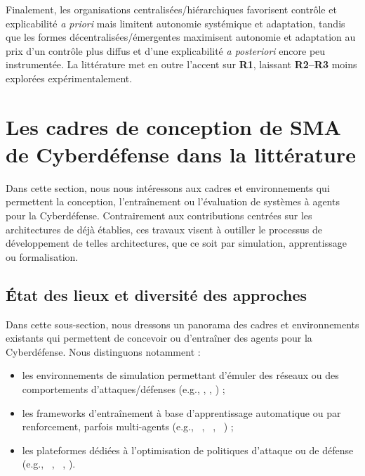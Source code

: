 Finalement, les organisations centralisées/hiérarchiques favorisent contrôle et explicabilité \emph{a priori} mais limitent autonomie systémique et adaptation, tandis que les formes décentralisées/émergentes maximisent autonomie et adaptation au prix d'un contrôle plus diffus et d'une explicabilité \emph{a posteriori} encore peu instrumentée. La littérature met en outre l'accent sur \textbf{R1}, laissant \textbf{R2--R3} moins explorées expérimentalement.



\section{Les cadres de conception de SMA de Cyberdéfense dans la littérature}\label{sec:sma-cyberdefense-conception}

Dans cette section, nous nous intéressons aux cadres et environnements qui permettent la conception, l'entraînement ou l'évaluation de systèmes à agents pour la Cyberdéfense. Contrairement aux contributions centrées sur les architectures de  déjà établies, ces travaux visent à outiller le processus de développement de telles architectures, que ce soit par simulation, apprentissage ou formalisation.

\subsection{État des lieux et diversité des approches}

Dans cette sous-section, nous dressons un panorama des cadres et environnements existants qui permettent de concevoir ou d'entraîner des agents pour la Cyberdéfense. Nous distinguons notamment :
\begin{itemize}
  \item les environnements de simulation permettant d'émuler des réseaux ou des comportements d'attaques/défenses (e.g., , , ) ;
  \item les frameworks d'entraînement à base d'apprentissage automatique ou par renforcement, parfois multi-agents (e.g., ~\cite{Hammar2023}, \allowbreak {}~\cite{CROND}, ~\cite{10.1145/2739482.2768429}) ;
  \item les plateformes dédiées à l'optimisation de politiques d'attaque ou de défense (e.g., ~\cite{Nguyen2025}, ~\cite{Hammar2023}, ).
\end{itemize}%

